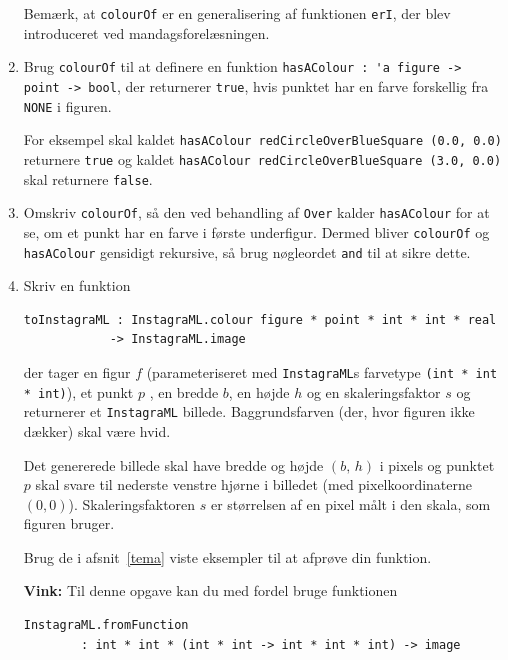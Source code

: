 \documentclass[a4paper,12pt]{article}
\begin{document}
\begin{enumerate}[{5G}1]
  Bemærk, at \lstinline{colourOf} er en generalisering af funktionen
  \lstinline{erI}, der blev introduceret ved mandagsforelæsningen.

\item Brug \lstinline{colourOf} til at definere en funktion
  \lstinline{hasAColour : 'a figure -> point -> bool}, der returnerer
  \lstinline{true}, hvis punktet har en farve forskellig fra
  \lstinline{NONE} i figuren.

  For eksempel skal kaldet
  \lstinline{hasAColour redCircleOverBlueSquare (0.0, 0.0)}
  returnere \lstinline{true} og kaldet
  \lstinline{hasAColour redCircleOverBlueSquare (3.0, 0.0)}
  skal returnere \lstinline{false}.

\item Omskriv \lstinline{colourOf}, så den ved behandling af
  \lstinline{Over} kalder \lstinline{hasAColour} for at se, om et punkt
  har en farve i første underfigur.  Dermed bliver
  \lstinline{colourOf} og \lstinline{hasAColour} gensidigt rekursive,
  så brug nøgleordet \lstinline{and} til at sikre dette.

\item Skriv en funktion

\begin{lstlisting}
toInstagraML : InstagraML.colour figure * point * int * int * real
            -> InstagraML.image
\end{lstlisting}

der tager en figur $f$ (parameteriseret med \lstinline{InstagraML}s
farvetype \lstinline{(int * int * int)}), et punkt $p$ , en bredde
$b$, en højde $h$ og en skaleringsfaktor $s$ og returnerer et
\lstinline{InstagraML} billede.  Baggrundsfarven (der, hvor figuren
ikke dækker) skal være hvid.

Det genererede billede skal have bredde og højde $(b,\,h)$ i pixels og
punktet $p$ skal svare til nederste venstre hjørne i billedet (med
pixelkoordinaterne $(0,0)$).  Skaleringsfaktoren $s$ er størrelsen af
en pixel målt i den skala, som figuren bruger.

Brug de i afsnit~\ref{tema} viste eksempler til at afprøve din funktion.

\textbf{Vink:} Til denne opgave kan du med fordel bruge funktionen

{\small
\begin{lstlisting}
InstagraML.fromFunction
        : int * int * (int * int -> int * int * int) -> image
\end{lstlisting}
}


\end{enumerate}
\end{document}
